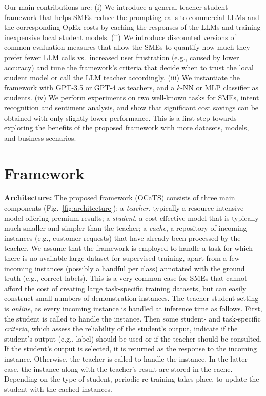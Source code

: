 \documentclass[11pt]{article}
\begin{document}
Our main contributions are: (i) We introduce a general teacher-student framework that helps SMEs reduce the prompting calls to commercial LLMs and the corresponding OpEx costs by caching the responses of the LLMs and training inexpensive local student models. (ii) We introduce discounted versions of common evaluation measures that allow the SMEs to quantify how much they prefer fewer LLM calls vs.\ increased user frustration (e.g., caused by lower accuracy) and tune the framework's criteria that decide when to trust the local student model or call the LLM teacher accordingly. (iii) We instantiate the framework with GPT-3.5 or GPT-4 as teachers, and a $k$-NN or MLP classifier as students. (iv) We perform experiments on two well-known tasks for SMEs, intent recognition and sentiment analysis, and show that significant cost savings can be obtained with only slightly lower performance. This is a first step towards exploring the benefits of the proposed framework with more datasets, models, and business scenarios.

\section{Framework} \label{sec:framework}

\noindent\textbf{Architecture:} The proposed framework (OCaTS) consists of three main components (Fig.~\ref{fig:architecture}): a \emph{teacher}, typically a resource-intensive model offering premium results; a \emph{student}, a cost-effective model that is typically much smaller and simpler than the teacher; a \emph{cache}, a repository of incoming instances (e.g., customer requests) that have already been processed by the teacher. We assume that the framework is employed to handle a task for which there is no available large dataset for supervised training, apart from a few incoming instances (possibly a handful per class) annotated with the ground truth (e.g., correct labels). This is a very common case for SMEs that cannot afford the cost of creating large task-specific training datasets, but can easily construct small numbers of demonstration instances. The teacher-student setting is \emph{online}, as every incoming instance is handled at inference time as follows. First, the student is called to handle the instance. Then some student- and task-specific \emph{criteria}, which assess the reliability of the student's output, indicate if the student's output (e.g., label) should be used or if the teacher should be consulted. If the student's output is selected, it is returned as the response to the incoming instance. Otherwise, the teacher is called to handle the instance. In the latter case, the instance along with the teacher's result are stored in the cache. Depending on the type of student, periodic re-training takes place, to update the student with the cached instances.
\end{document}
